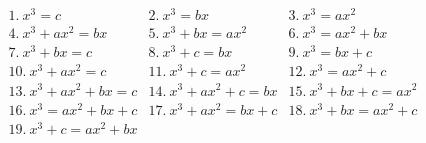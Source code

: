 \documentclass[preview]{standalone}
\begin{document}
\begin{align*}
1.\ x^3=c &2.\ x^3=bx &3.\ x^3=ax^2\\ 4.\ x^3+ax^2=bx &5.\ x^3+bx=ax^2 &6.\ x^3=ax^2+bx \\ 7.\ x^3+bx=c &8.\ x^3+c=bx &9.\ x^3=bx+c \\ 10.\ x^3+ax^2=c &11.\ x^3+c=ax^2 &12.\ x^3=ax^2+c \\ 13.\ x^3+ax^2+bx=c &14.\ x^3+ax^2+c=bx &15.\ x^3+bx+c=ax^2 \\ 16.\ x^3=ax^2+bx+c &17.\ x^3+ax^2=bx+c &18.\ x^3+bx=ax^2+c \\ 19.\ x^3+c=ax^2+bx
\end{align*}
\end{document}
